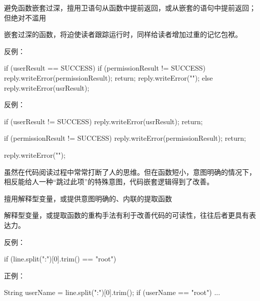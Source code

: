 \begin{content}
\begin{regulation}
避免函数嵌套过深，擅用卫语句从函数中提前返回，或从嵌套的语句中提前返回；但绝对不滥用
\end{regulation}

嵌套过深的函数，将迫使读者跟踪运行时，同样给读者增加过重的记忆包袱。

反例：
\begin{leftbar}
\begin{c++}
if (userResult == SUCCESS)
{
    if (permissionResult != SUCCESS)
    {
        reply.writeError(permissionResult);
        return;
    }
    reply.writeError("");
}
else
{
    reply.writeError(usrResult);
}
\end{c++}
\end{leftbar}

反例：
\begin{leftbar}
\begin{c++}
if (userResult != SUCCESS)
{
    reply.writeError(usrResult);
    return;
}

if (permissionResult != SUCCESS)
{
    reply.writeError(permissionResult);
    return;
}

reply.writeError("");

\end{c++}
\end{leftbar}

虽然在代码阅读过程中常常打断了人的思维。但在函数短小，意图明确的情况下，相反能给人一种“跳过此项”的特殊意图，代码嵌套逻辑得到了改善。

\begin{regulation}
擅用解释型变量，或提供意图明确的、内联的提取函数
\end{regulation}

解释型变量，或提取函数的重构手法有利于改善代码的可读性，往往后者更具有表达力。

反例：
\begin{leftbar}
\begin{c++}
if (line.split(":")[0].trim() == "root")
\end{c++}
\end{leftbar}

正例：
\begin{leftbar}
\begin{c++}
String userName = line.split(":")[0].trim();
if (userName == "root")
{
    ...
}
\end{c++}
\end{leftbar}


\end{content}
